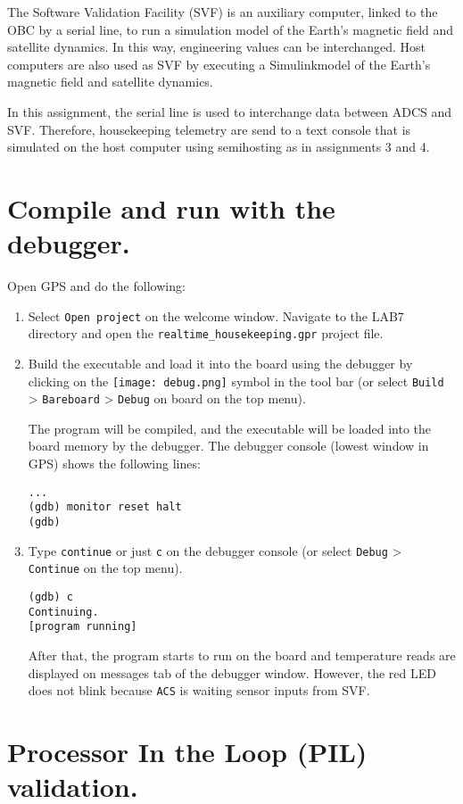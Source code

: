The Software Validation Facility (SVF) is an auxiliary computer, linked to the OBC by a serial line, to run a simulation model of the Earth's magnetic field and satellite dynamics. In this way, engineering values can be interchanged.
Host computers are also used as SVF by executing a Simulink\texttrademark model of the Earth's magnetic field and satellite dynamics.

In this assignment, the serial line is used to interchange data between ADCS and SVF. Therefore, housekeeping telemetry are send to a text console that is simulated on the host computer using semihosting as in assignments 3 and 4.

\section{Compile and run with the debugger.}

Open GPS and do the following:
\begin{enumerate}
\item Select {\tt Open project} on the welcome window. Navigate to the LAB7 directory and open the {\tt realtime\_housekeeping.gpr} project file.
\item Build the executable and load it into the board using the debugger by clicking on the \hbox{\texttt{[image: debug.png]}} symbol in the tool bar (or select {\tt Build} > {\tt Bareboard} > {\tt Debug} on board on the top menu).

The program will be compiled, and the executable will be loaded into the board memory by the debugger. The debugger console (lowest window in GPS) shows the following lines:
\begin{verbatim}
...
(gdb) monitor reset halt
(gdb)
\end{verbatim}

\item Type {\tt continue} or just {\tt c} on the debugger console (or select {\tt Debug} > {\tt Continue} on the top menu).
\begin{verbatim}
(gdb) c
Continuing.
[program running]
\end{verbatim}

After that, the program starts to run on the board and temperature reads are displayed on messages tab of the debugger window. However, the red LED does not blink because {\tt ACS} is waiting sensor inputs from SVF.
\end{enumerate}

\section{Processor In the Loop (PIL) validation.}

